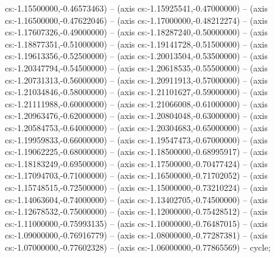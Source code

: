 cs:-1.15500000,-0.46573463) -- (axis cs:-1.15925541,-0.47000000) -- (axis cs:-1.16500000,-0.47622046) -- (axis cs:-1.17000000,-0.48212274) -- (axis cs:-1.17607326,-0.49000000) -- (axis cs:-1.18287240,-0.50000000) -- (axis cs:-1.18877351,-0.51000000) -- (axis cs:-1.19141728,-0.51500000) -- (axis cs:-1.19613356,-0.52500000) -- (axis cs:-1.20013504,-0.53500000) -- (axis cs:-1.20347794,-0.54500000) -- (axis cs:-1.20618535,-0.55500000) -- (axis cs:-1.20731313,-0.56000000) -- (axis cs:-1.20911913,-0.57000000) -- (axis cs:-1.21034846,-0.58000000) -- (axis cs:-1.21101627,-0.59000000) -- (axis cs:-1.21111988,-0.60000000) -- (axis cs:-1.21066008,-0.61000000) -- (axis cs:-1.20963476,-0.62000000) -- (axis cs:-1.20804048,-0.63000000) -- (axis cs:-1.20584753,-0.64000000) -- (axis cs:-1.20304683,-0.65000000) -- (axis cs:-1.19959833,-0.66000000) -- (axis cs:-1.19547473,-0.67000000) -- (axis cs:-1.19062225,-0.68000000) -- (axis cs:-1.18500000,-0.68995917) -- (axis cs:-1.18183249,-0.69500000) -- (axis cs:-1.17500000,-0.70477424) -- (axis cs:-1.17094703,-0.71000000) -- (axis cs:-1.16500000,-0.71702052) -- (axis cs:-1.15748515,-0.72500000) -- (axis cs:-1.15000000,-0.73210224) -- (axis cs:-1.14063604,-0.74000000) -- (axis cs:-1.13402705,-0.74500000) -- (axis cs:-1.12678532,-0.75000000) -- (axis cs:-1.12000000,-0.75428512) -- (axis cs:-1.11000000,-0.75993135) -- (axis cs:-1.10000000,-0.76487015) -- (axis cs:-1.09000000,-0.76916779) -- (axis cs:-1.08000000,-0.77287381) -- (axis cs:-1.07000000,-0.77602328) -- (axis cs:-1.06000000,-0.77865569) -- cycle;
